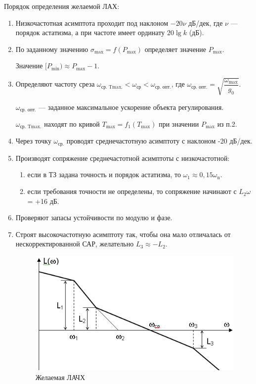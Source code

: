 \documentclass[unicode, 12pt, a4paper, oneside]{article}
\begin{document}
Порядок определения желаемой ЛАХ:
\begin{enumerate}
\item Низкочастотная асимптота проходит под наклоном $ -20\nu $ дБ/дек, где $ \nu $ --- порядок астатизма, а при частоте имеет ординату $ 20\lg k $ (дБ).
\item По заданному значению $ \sigma_\text{max} = f(P_\text{max}) $ определяет значение $ P_\text{max} $.
\par Значение $ [P_\text{min}) \approx P_\text{max} - 1 $.

\item Определяют частоту среза $ \omega_\text{ср. Tmax.} < \omega_\text{ср} < \omega_\text{ср. опт.} $, где $ \omega_\text{ср. опт.} = \sqrt{\dfrac{\omega_\text{max}}{g_0}} $.
\par $ \omega_\text{ср. опт.} $ --- заданное максимальное ускорение объекта регулирования.
\par $ \omega_\text{ср. Tmax.} $ находят по кривой $ T_\text{max} = f_1(T_\text{max}) $ при значении $ P_\text{max} $ из п.2.

\item Через точку $ \omega_\text{ср.} $  проводят среднечастотную асимптоту с наклоном -20 дБ/дек.
\item Производят сопряжение среднечастотной асимптоты с низкочастотной:
	\begin{enumerate}
	\item если в ТЗ задана точность и порядок астатизма, то $ \omega_1 \approx 0,15\omega_\text{n} $.
	\item если требования точности не определены, то сопряжение начинают с $ L_2\omega $ = +16 дБ.
	\end{enumerate}

\item Проверяют запасы устойчивости по модулю и фазе.
\item Строят высокочастотную асимптоту так, чтобы она мало отличалась от нескорректированной САР, желательно $ L_3 \approx -L_2 $.

\begin{figure}[H]
\centering
\includegraphics[width=0.5\linewidth]{29_lachh.png}
\caption{Желаемая ЛАЧХ}
\end{figure}

\end{enumerate}
\end{document}
